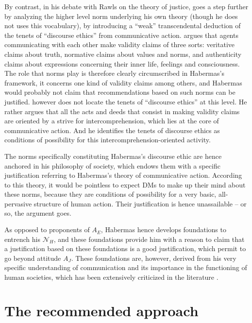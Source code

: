 \documentclass[preprint, french, english, 11pt, authoryear]{elsarticle}%
\begin{document}
By contrast, in his debate with Rawls on the theory of justice, \citet{habermas_moralbewustsein_1983} goes a step further by analyzing the higher level norm underlying his own theory (though he does not uses this vocabulary),
by introducing a “weak” transcendental deduction of the tenets of “discourse ethics” from communicative action. 
\citet{habermas_theorie_1981} argues that agents communicating with each other make validity claims of three sorts: veritative claims about truth, normative claims about values and norms, and authenticity claims about expressions concerning their inner life, feelings and consciousness. 
The role that norms play is therefore clearly circumscribed in Habermas's framework, it concerns one kind of validity claims among others, and Habermas would probably not claim that recommendations based on such norms can be justified. 
\cite{habermas_moralbewustsein_1983} however does not locate the tenets of “discourse ethics” at this level. 
He rather argues that all the acts and deeds that consist in making validity claims are oriented by a strive for intercomprehension, which lies at the core of communicative action. And he identifies the tenets of discourse ethics as conditions of possibility for this intercomprehension-oriented activity. 


The norms specifically constituting Habermas's discourse ethic are hence anchored in his philosophy of society, which endows them with a specific justification referring to Habermas's theory of communicative action.
According to this theory, it would be pointless to expect \acp{DM}
 to make up their mind about these norms, because 
they are conditions of possibility for a very basic, all-pervasive structure of human action. Their justification is hence unassailable -- or so, the argument goes.

As opposed to proponents of $A_E$, Habermas hence develops foundations to entrench his $\mathscr{N}_{H}$, and these foundations provide him with a reason to claim that a justification based on these foundations is a good justification, which permit to go beyond attitude $A_J$. 
These foundations are, however, derived from his very specific understanding of communication and its importance in the functioning of human societies, which has been extensively criticized in the literature \citep{heath_communicative_2001,honneth_kritik_1985,benhabib_situating_1992}. 


\section{The recommended approach}
\label{sec:recomm}
\end{document}
